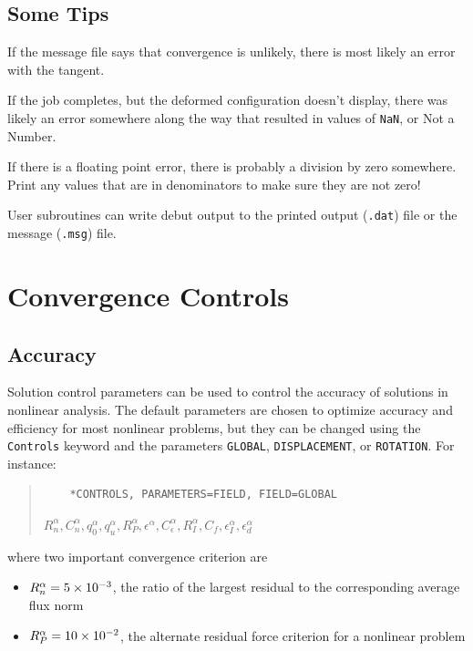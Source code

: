 \documentclass[10pt,letterpaper,oneside]{report}
\begin{document}
\subsection{Some Tips}
If the message file says that convergence is unlikely, there is most likely an error with the tangent.

If the job completes, but the deformed configuration doesn't display, there was likely an error somewhere along the way that resulted in values of \texttt{NaN}, or Not a Number.  

If there is a floating point error, there is probably a division by zero somewhere.  Print any values that are in denominators to make sure they are not zero!

User subroutines can write debut output to the printed output (\texttt{.dat}) file or the message (\texttt{.msg}) file. 




\section{Convergence Controls}

\subsection{Accuracy}
Solution control parameters can be used to control the accuracy of solutions in nonlinear analysis.  The default parameters are chosen to optimize accuracy and efficiency for most nonlinear problems, but they can be changed using the \texttt{Controls} keyword and the parameters \texttt{GLOBAL}, \texttt{DISPLACEMENT}, or \texttt{ROTATION}.  For instance:
\begin{quote} 
    \begin{lstlisting}
    *CONTROLS, PARAMETERS=FIELD, FIELD=GLOBAL
    \end{lstlisting} 
    $R_n^\alpha, C_n^\alpha, q_0^\alpha, q_u^\alpha, R_P^\alpha, \epsilon^\alpha, C_\epsilon^\alpha, R^\alpha_I, C_f, \epsilon^\alpha_I, \epsilon^\alpha_d$
\end{quote}
where two important convergence criterion are
\begin{itemize}
\item $R_n^\alpha = \num{5E-3}$, the ratio of the largest residual to the corresponding average flux norm
\item $R_P^\alpha = \num{10E-2}$, the alternate residual force criterion for a nonlinear problem
\end{itemize}
\end{document}
